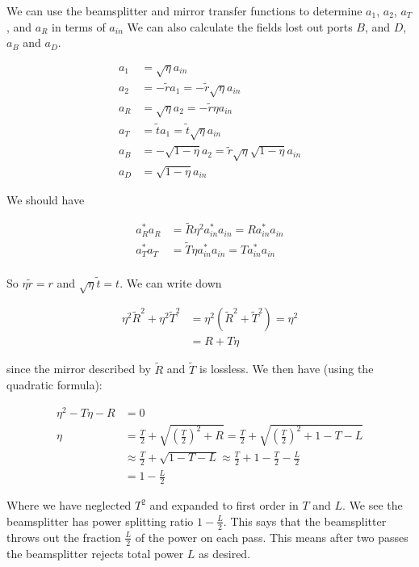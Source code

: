 \documentclass[12pt]{article}
\begin{document}
We can use the beamsplitter and mirror transfer functions to determine $a_1$, $a_2$, $a_T$, and $a_R$ in terms of $a_{in}$ We can also calculate the fields lost out ports $B$, and $D$, $a_B$ and $a_D$.

\begin{align}
a_1 &= \sqrt{\eta} a_{in}\\
a_2 &= -\tilde{r} a_1 = -\tilde{r} \sqrt{\eta} a_{in}\\
a_R &= \sqrt{\eta} a_2 = -\tilde{r} \eta a_{in}\\
a_T &= \tilde{t} a_1 = \tilde{t} \sqrt{\eta} a_{in}\\
a_B &= -\sqrt{1-\eta} a_2 = \tilde{r} \sqrt{\eta}\sqrt{1-\eta} a_{in}\\
a_D &= \sqrt{1-\eta} a_{in}
\end{align}

We should have

\begin{align}
a_R^*a_R &= \tilde{R} \eta^2 a_{in}^* a_{in} = R a^*_{in} a_{in}\\
a_T^*a_T &= \tilde{T} \eta a_{in}^* a_{in} = T a^*_{in} a_{in}\\
\end{align}

So $\eta \tilde{r} = r$ and $ \sqrt{\eta} \tilde{t} = t$. We can write down

\begin{align}
\eta^2 \tilde{R}^2 + \eta^2 \tilde{T}^2 &= \eta^2 (\tilde{R}^2 + \tilde{T}^2) = \eta^2\\
&= R + T \eta
\end{align}

since the mirror described by $\tilde{R}$ and $\tilde{T}$ is lossless. We then have (using the quadratic formula):

\begin{align}
\eta^2 - T \eta - R &= 0\\
\eta &= \frac{T}{2} + \sqrt{\left(\frac{T}{2}\right)^2 + R} = \frac{T}{2} + \sqrt{\left(\frac{T}{2} \right)^2 + 1 - T - L}\\
&\approx \frac{T}{2} + \sqrt{1 - T - L} \approx \frac{T}{2} + 1 - \frac{T}{2} - \frac{L}{2}\\
&= 1 - \frac{L}{2}
\end{align}

Where we have neglected $T^2$ and expanded to first order in $T$ and $L$. We see the beamsplitter has power splitting ratio $1-\frac{L}{2}$. This says that the beamsplitter throws out the fraction $\frac{L}{2}$ of the power on each pass. This means after two passes the beamsplitter rejects total power $L$ as desired.
\end{document}
